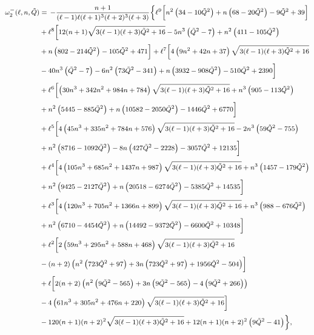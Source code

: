 \documentclass[11pt]{article}
\numberwithin{equation}{section}
\begin{document}
\begin{equation}\footnotesize
\begin{aligned}
\omega_2^-(\ell,n,\tilde{Q})&=\,-\frac{n+1}{(\ell-1) \ell (\ell+1)^3 (\ell+2)^3 (\ell+3)}\biggl\{\ell^9 \biggl[n^2 \left(34-10 \tilde{Q}^2\right)+n \left(68-20 \tilde{Q}^2\right)-9 \tilde{Q}^2+39\biggr]\\
&+\ell^8 \biggl[12 (n+1) \sqrt{3 (\ell-1) (\ell+3) \tilde{Q}^2+16}-5 n^3 \left(\tilde{Q}^2-7\right)+n^2 \left(411-105 \tilde{Q}^2\right)\\
&+n \left(802-214 \tilde{Q}^2\right)-105 \tilde{Q}^2+471\biggr]+\ell^7 \biggl[4 \left(9 n^2+42 n+37\right) \sqrt{3 (\ell-1) (\ell+3) \tilde{Q}^2+16}\\
&-40 n^3 \left(\tilde{Q}^2-7\right)-6 n^2 \left(73 \tilde{Q}^2-341\right)+n \left(3932-908 \tilde{Q}^2\right)-510 \tilde{Q}^2+2390\biggr]\\
&+\ell^6 \biggl[\left(30 n^3+342 n^2+984 n+784\right) \sqrt{3 (\ell-1) (\ell+3) \tilde{Q}^2+16}+n^3 \left(905-113 \tilde{Q}^2\right)\\
&+n^2 \left(5445-885 \tilde{Q}^2\right)+n \left(10582-2050 \tilde{Q}^2\right)-1446 \tilde{Q}^2+6770\biggr]\\
&+\ell^5 \biggl[4 \left(45 n^3+335 n^2+784 n+576\right) \sqrt{3 (\ell-1) (\ell+3) \tilde{Q}^2+16}-2 n^3 \left(59 \tilde{Q}^2-755\right)\\
&+n^2 \left(8716-1092 \tilde{Q}^2\right)-8 n \left(427 \tilde{Q}^2-2228\right)-3057 \tilde{Q}^2+12135\biggr]\\
&+\ell^4 \biggl[4 \left(105 n^3+685 n^2+1437 n+987\right) \sqrt{3 (\ell-1) (\ell+3) \tilde{Q}^2+16}+n^3 \left(1457-179 \tilde{Q}^2\right)\\
&+n^2 \left(9425-2127 \tilde{Q}^2\right)+n \left(20518-6274 \tilde{Q}^2\right)-5385 \tilde{Q}^2+14535\biggr]\\
&+\ell^3 \biggl[4 \left(120 n^3+705 n^2+1366 n+899\right) \sqrt{3 (\ell-1) (\ell+3) \tilde{Q}^2+16}+n^3 \left(988-676 \tilde{Q}^2\right)\\
&+n^2 \left(6710-4454 \tilde{Q}^2\right)+n \left(14492-9372 \tilde{Q}^2\right)-6600 \tilde{Q}^2+10348\biggr]\\
&+\ell^2 \biggl[2 \left(59 n^3+295 n^2+588 n+468\right) \sqrt{3 (\ell-1) (\ell+3) \tilde{Q}^2+16}\\
&-(n+2) \left(n^2 \left(723 \tilde{Q}^2+97\right)+3 n \left(723 \tilde{Q}^2+97\right)+1956 \tilde{Q}^2-504\right)\biggr]\\
&+\ell \biggl[2 (n+2) \left(n^2 \left(9 \tilde{Q}^2-565\right)+3 n \left(9 \tilde{Q}^2-565\right)-4 \left(9 \tilde{Q}^2+266\right)\right)\\
&-4 \left(61 n^3+305 n^2+476 n+220\right) \sqrt{3 (\ell-1) (\ell+3) \tilde{Q}^2+16}\biggr]\\
&-120 (n+1) (n+2)^2 \sqrt{3 (\ell-1) (\ell+3) \tilde{Q}^2+16}+12 (n+1) (n+2)^2 \left(9 \tilde{Q}^2-41\right)\biggr\},
\end{aligned}
\end{equation}
\end{document}
